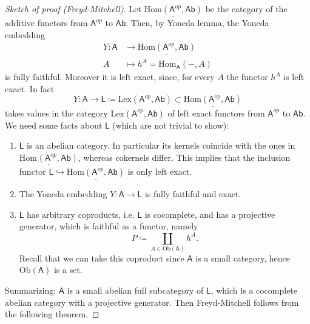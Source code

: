\begin{proof}[Sketch of proof (Freyd-Mitchell)]
	Let $\underline{\mathrm{Hom}\left( \mathsf{A}^{op}, \mathsf{Ab} \right)}$
	be the category of the additive functors from $\mathsf{A}^{op}$ to $\mathsf{Ab}$.
	Then, by Yoneda lemma, the Yoneda embedding
	\begin{align}
		Y\colon \mathsf{A} &\to
		\underline{\mathrm{Hom}\left( \mathsf{A}^{op}, \mathsf{Ab} \right)} \\
		A &\mapsto h^A = \mathrm{Hom}_{\mathsf{A}} \left( -, A \right)
	\end{align} 
	is fully faithful.
	Moreover it is left exact, since, for every $A$ the functor $h^A$ is left exact.
	In fact
	\begin{equation}
		Y\colon \mathsf{A} \to \mathsf{L} \coloneqq \mathrm{Lex} \left(\mathsf{A}^{op}, \mathsf{Ab}\right) \subset
	\underline{\mathrm{Hom}\left( \mathsf{A}^{op}, \mathsf{Ab} \right)}
	\end{equation} 
	takes values in the category $\mathrm{Lex}\left(\mathsf{A}^{op}, \mathsf{Ab}\right)$ of
	left exact functors from $\mathsf{A}^{op}$ to $\mathsf{Ab}$.
	We need some facts about $\mathsf{L}$ (which are not trivial to show):
	\begin{enumerate}
		\item $\mathsf{L}$ is an abelian category.
			In particular its kernels coincide with the ones in
			$\underline{\mathrm{Hom}_{ }\left( \mathsf{A}^{op}, \mathsf{Ab} \right)}$,
			whereas cokernels differ.
			This implies that the inclusion functor $\mathsf{L} \hookrightarrow
			\underline{\mathrm{Hom}\left( \mathsf{A}^{op}, \mathsf{Ab} \right)}$
			is only left exact.
		\item The Yoneda embedding $Y\colon \mathsf{A} \to \mathsf{L}$ is fully faithful and exact.
		\item $\mathsf{L}$ has arbitrary coproducts, i.e. $\mathsf{L}$ is cocomplete,
			and has a projective generator, which is faithful as a functor, 
			namely
			\begin{equation}
			P \coloneqq \coprod_{A \in \mathrm{Ob} \left(\mathsf{A}\right)} h^A
			.\end{equation} 
			Recall that we can take this coproduct since $\mathsf{A}$ is a small category,
			hence $\mathrm{Ob} \left(\mathsf{A}\right)$ is a set.
	\end{enumerate}
	Summarizing: $\mathsf{A}$ is a small abelian full subcategory of $\mathsf{L}$, which is a
	cocomplete abelian category with a projective generator.
	Then Freyd-Mitchell follows from the following theorem.
\end{proof}

